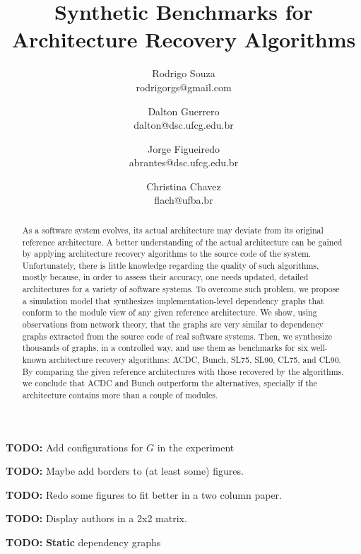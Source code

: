\documentclass[11pt,twocolumn,a4paper,english]{article}
\title{
Synthetic Benchmarks for Architecture Recovery Algorithms}
\author{Rodrigo Souza \\ rodrigorgs@gmail.com 
\and Dalton Guerrero \\ dalton@dsc.ufcg.edu.br
\and Jorge Figueiredo \\ abrantes@dsc.ufcg.edu.br
\and Christina Chavez \\ flach@ufba.br
}
\newcommand{\TODO}{\textbf{TODO:} }
\begin{document}
\sloppy
\maketitle

\tableofcontents
\vspace{1 em}

\TODO Add configurations for $G$ in the experiment

\TODO Maybe add borders to (at least some) figures.

\TODO Redo some figures to fit better in a two column paper.

\TODO Display authors in a 2x2 matrix.

\TODO \textbf{Static} dependency graphs



\begin{abstract}
	As a software system evolves, its actual architecture may deviate from its original reference architecture. A better understanding of the actual architecture can be gained by applying architecture recovery algorithms to the source code of the system. Unfortunately, there is little knowledge regarding the quality of such algorithms, mostly because, in order to assess their accuracy, one needs updated, detailed architectures for a variety of software systems.
	To overcome such problem, we propose a simulation model that synthesizes implementation-level dependency graphs that conform to the module view of any given reference architecture. We show, using observations from network theory, that the graphs are very similar to dependency graphs extracted from the source code of real software systems. 
	Then, we synthesize thousands of graphs, in a controlled way, and use them as benchmarks for six well-known architecture recovery algorithms: ACDC, Bunch, SL75, SL90, CL75, and CL90. By comparing the given reference architectures with those recovered by the algorithms, we conclude that ACDC and Bunch outperform the alternatives, specially if the architecture contains more than a couple of modules.\end{abstract}
\end{document}
